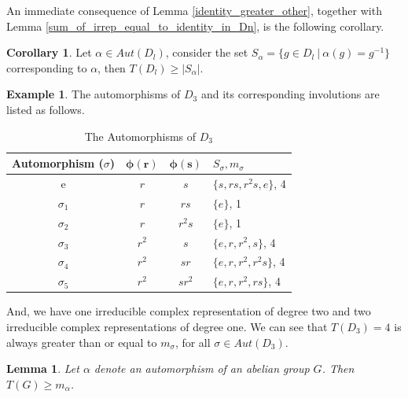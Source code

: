 \documentclass{amsart}
\newtheorem{lemma}[theorem]{Lemma}
\theoremstyle{definition}
\newtheorem{corollary}[theorem]{Corollary}
\newtheorem{example}[theorem]{Example}
\theoremstyle{remark}
\newcommand{\Aut}{Aut}
\numberwithin{equation}{section}
\begin{document}
        An immediate consequence of Lemma \ref{identity_greater_other}, together with Lemma \ref{sum_of_irrep_equal_to_identity_in_Dn}, is the following corollary.
        \begin{corollary}\label{main_theorem}
            Let $\alpha\in \Aut(D_l) $, consider the set $S_{\alpha} = \{g \in D_l \ | \ \alpha(g) = g^{-1}\}$ corresponding to $\alpha$, then $T(D_l) \geq |S_{\alpha}|$.
        \end{corollary}
        \begin{example}
            The automorphisms of $D_3$ and its corresponding involutions are listed as follows.
            \begin{table}[H]
                \centering
                \caption{The Automorphisms of $D_3$}
                \label{tab:aut_d3}
                \begin{tabular}{@{} |c c c l| @{}} %
                    \toprule
                    \textbf{Automorphism ($\sigma$)} & $\boldsymbol{\phi(r)}$ & $\boldsymbol{\phi(s)}$ & \textbf{$S_{\sigma}, m_{\sigma}$} \\
                    \midrule
                    e & $r$ & $s$ & $\{s, rs, r^2s, e\}$, 4 \\
                    $\sigma_1$ & $r$ & $rs$ & $\{e\}$, 1 \\
                    $\sigma_2$ & $r$ & $r^2s$ & $\{e\}$, 1 \\
                    \midrule
                    $\sigma_3$ & $r^2$ & $s$ & $\{e, r, r^2, s\}$, 4 \\
                    $\sigma_4$ & $r^2$ & $sr$ & $\{e, r, r^2, r^2s\}$, 4 \\
                    $\sigma_5$ & $r^2$ & $sr^2$ & $\{e, r, r^2, rs\}$, 4 \\
                    \bottomrule
                \end{tabular}
            \end{table}
            And, we have one irreducible complex representation of degree two and two irreducible complex representations of degree one. We can see that $T(D_3) = 4$ is always greater than or equal to $m_{\sigma}$, for all $\sigma \in \Aut(D_3)$.
        \end{example}
        \begin{lemma}\label{abelian_final_result}
            Let $\alpha$ denote an automorphism of an abelian group $G$. Then $T(G) \geq m_{\alpha}$.
        \end{lemma}
\end{document}

